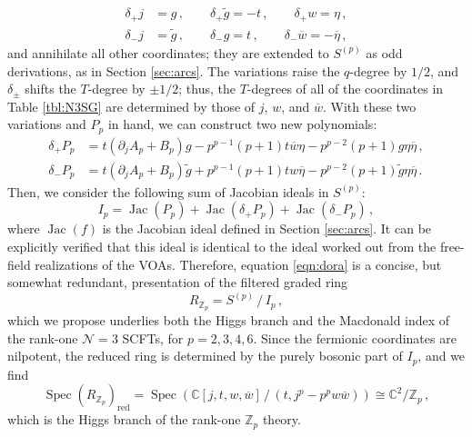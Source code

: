 \documentclass[12pt]{article}
\numberwithin{equation}{section}
\numberwithin{figure}{section}
\theoremstyle{plain}
\theoremstyle{definition}
\begin{document}
\begin{equation}
  \begin{aligned}
    \delta_+ j &= g \,, \qquad \delta_+ \widetilde{g} = - t \,, \qquad \delta_+ w = \eta \,, \\
    \delta_- j &= \widetilde{g} \,, \qquad \delta_- g = t \,, \qquad \delta_- \overline{w} = -\overline{\eta} \,,
  \end{aligned}
\end{equation}
and annihilate all other coordinates; they are extended to $S^{(p)}$ as odd derivations, as in Section \ref{sec:arcs}. The variations raise the $q$-degree by $1/2$, and $\delta_\pm$ shifts the $T$-degree by $\pm 1/2$; thus, the $T$-degrees of all of the coordinates in Table \ref{tbl:N3SG} are determined by those of $j$, $w$, and $\overline{w}$. With these two variations and $P_p$ in hand, we can construct two new polynomials:
\begin{equation}\label{eqn:superpartnerpotentials}
    \begin{aligned}
        \delta_+ P_p &= t(\partial_j A_p + B_p)g - p^{p-1} (p+1) t \overline{w} \eta - p^{p-2} (p+1) g \eta \overline{\eta} \,, \\
        \delta_- P_p &= t(\partial_j A_p + B_p)\widetilde{g} + p^{p-1} (p+1) t w \overline{\eta} - p^{p-2} (p+1) \widetilde{g} \eta \overline{\eta} \,.
    \end{aligned}
\end{equation}
Then, we consider the following sum of Jacobian ideals in $S^{(p)}$:
\begin{equation}\label{eqn:dora}
    I_p = \operatorname{Jac}(P_p) + \operatorname{Jac}(\delta_+ P_p) + \operatorname{Jac}(\delta_- P_p) \,,
\end{equation}
where $\operatorname{Jac}(f)$ is the Jacobian ideal defined in Section \ref{sec:arcs}. It can be explicitly verified that this ideal is identical to the ideal worked out from the free-field realizations of the VOAs. Therefore, equation \eqref{eqn:dora} is a concise, but somewhat redundant, presentation of the filtered graded ring
\begin{equation}
    R_{\mathbb{Z}_p} = S^{(p)} \, / \, I_p \,,
\end{equation}
which we propose underlies both the Higgs branch and the Macdonald index of the rank-one $\mathcal{N}=3$ SCFTs, for $p = 2, 3, 4, 6$. Since the fermionic coordinates are nilpotent, the reduced ring is determined by the purely bosonic part of $I_p$, and we find
\begin{equation}
    \operatorname{Spec}(R_{\mathbb{Z}_p})_\text{red} = \operatorname{Spec}\left( \mathbb{C}[j, t, w, \overline{w}] \, / \, (t, j^p - p^p w \overline{w}) \right) \cong \mathbb{C}^2 / \mathbb{Z}_p \,,
\end{equation}
which is the Higgs branch of the rank-one $\mathbb{Z}_p$ theory.
\end{document}
